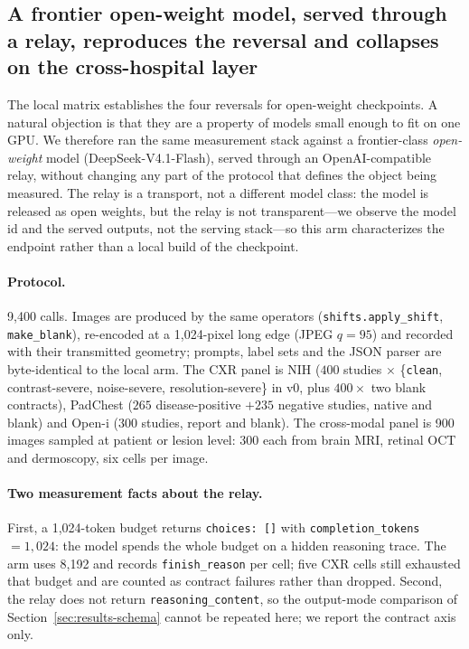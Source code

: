 \subsection{A frontier open-weight model, served through a relay, reproduces the reversal and collapses on the cross-hospital layer}
\label{sec:results-frontier}

The local matrix establishes the four reversals for open-weight checkpoints. A
natural objection is that they are a property of models small enough to fit on one
GPU. We therefore ran the same measurement stack against a frontier-class
\emph{open-weight} model (DeepSeek-V4.1-Flash), served through an
OpenAI-compatible relay, without changing any part of the protocol that defines
the object being measured. The relay is a transport, not a different model class:
the model is released as open weights, but the relay is not transparent---we
observe the model id and the served outputs, not the serving stack---so this arm
characterizes the endpoint rather than a local build of the checkpoint.

{\sloppy
\paragraph{Protocol.} 9{,}400 calls. Images are produced by the same operators
(\texttt{shifts.apply\_shift}, \texttt{make\_blank}), re-encoded at a 1{,}024-pixel
long edge (JPEG $q{=}95$) and recorded with their transmitted geometry; prompts,
label sets and the JSON parser are byte-identical to the local arm. The CXR panel
is NIH ($400$ studies $\times$ \{\texttt{clean}, contrast-severe, noise-severe,
resolution-severe\} in v0, plus $400\times$ two blank contracts), PadChest
($265$ disease-positive $+235$ negative studies, native and blank) and Open-i
($300$ studies, report and blank). The cross-modal panel is 900 images sampled at
patient or lesion level: 300 each from brain MRI, retinal OCT and dermoscopy, six
cells per image.\par}

\paragraph{Two measurement facts about the relay.} First, a 1{,}024-token budget
returns \texttt{choices: []} with \texttt{completion\_tokens}${=}1{,}024$: the
model spends the whole budget on a hidden reasoning trace. The arm uses 8{,}192
and records \texttt{finish\_reason} per cell; five CXR cells still exhausted that
budget and are counted as contract failures rather than dropped. Second, the relay
does not return \texttt{reasoning\_content}, so the output-mode comparison of
Section~\ref{sec:results-schema} cannot be repeated here; we report the contract
axis only.

